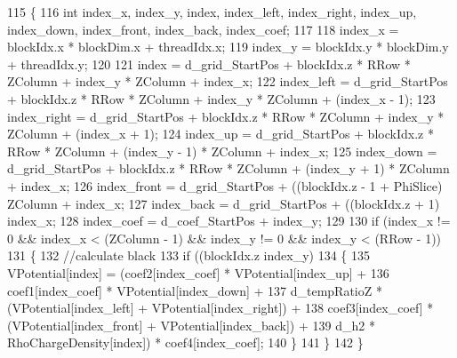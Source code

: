 \begin{DoxyCode}
115 \{
116     \textcolor{keywordtype}{int} index\_x, index\_y, index, index\_left, index\_right, index\_up, index\_down, index\_front, index\_back, 
      index\_coef;
117 
118     index\_x = blockIdx.x * blockDim.x + threadIdx.x;
119     index\_y = blockIdx.y * blockDim.y + threadIdx.y;
120 
121     index       = d\_grid\_StartPos + blockIdx.z * RRow * ZColumn + index\_y * ZColumn + index\_x;
122     index\_left  = d\_grid\_StartPos + blockIdx.z * RRow * ZColumn + index\_y * ZColumn + (index\_x - 1);
123     index\_right = d\_grid\_StartPos + blockIdx.z * RRow * ZColumn + index\_y * ZColumn + (index\_x + 1);
124     index\_up    = d\_grid\_StartPos + blockIdx.z * RRow * ZColumn + (index\_y - 1) * ZColumn + index\_x;
125     index\_down  = d\_grid\_StartPos + blockIdx.z * RRow * ZColumn + (index\_y + 1) * ZColumn + index\_x;
126     index\_front = d\_grid\_StartPos + ((blockIdx.z - 1 + PhiSlice) %
      ZColumn + index\_x;
127     index\_back  = d\_grid\_StartPos + ((blockIdx.z + 1) %
      index\_x;
128     index\_coef  = d\_coef\_StartPos + index\_y;
129 
130     \textcolor{keywordflow}{if} (index\_x != 0 && index\_x < (ZColumn - 1) && index\_y != 0 && index\_y < (RRow - 1))
131     \{
132         \textcolor{comment}{//calculate black       }
133         \textcolor{keywordflow}{if} ((blockIdx.z %
      index\_y) %
134         \{           
135             VPotential[index] = (coef2[index\_coef] * VPotential[index\_up] + 
136                                 coef1[index\_coef] * VPotential[index\_down] +                                
137                                 d\_tempRatioZ * (VPotential[index\_left] + VPotential[index\_right]) + 
138                                 coef3[index\_coef] * (VPotential[index\_front] + VPotential[index\_back]) + 
139                                 d\_h2 * RhoChargeDensity[index]) * coef4[index\_coef];
140         \}
141     \}
142 \}
\end{DoxyCode}
\hypertarget{PoissonSolver3DGPU_8cu_a6717666a25f968bb1d43300401b2fefb}{}\label{PoissonSolver3DGPU_8cu_a6717666a25f968bb1d43300401b2fefb} 
